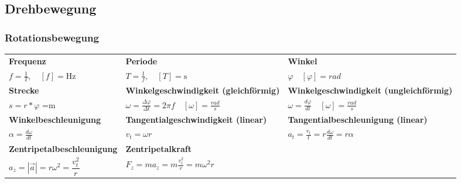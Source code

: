 \documentclass[10pt,a4paper]{article}
\begin{document}
		\subsection{Drehbewegung}
		\subsubsection{Rotationsbewegung}
		
		\begin{tabular}{p{} p{} p{}}
			
			\textbf{Frequenz} &
			\textbf{Periode} &
			\textbf{Winkel}
			\\[4pt]
			
			$f = \frac{1}{T},\quad [f] = \mathrm{Hz}$ &
			$T = \frac{1}{f},\quad [T] = \mathrm{s}$ &
			$\varphi \quad [\varphi]=rad$
			\\[10pt]
			
			\textbf{Strecke} &
            \textbf{Winkelgeschwindigkeit (gleichförmig)}&
			\textbf{Winkelgeschwindigkeit (ungleichförmig)}
			\\[4pt]
			
			$s = r*\varphi$ \quad [s]=m &
			$\omega = \frac{\Delta\varphi}{\Delta t} = 2\pi f \quad [\omega]=\frac{rad}{s}$ &
            $\omega = \frac{d\varphi}{dt} \quad [\omega]=\frac{rad}{s}$
			\\[10pt]
			
			\textbf{Winkelbeschleunigung} &
			\textbf{Tangentialgeschwindigkeit (linear)}&
			\textbf{Tangentialbeschleunigung (linear)}
			\\[4pt]
			
			$\alpha=\frac{d\omega}{dt}$ &
			$v_t = \omega r$ &
			$a_t = \frac{v_t}{t} = r \frac{d\omega}{dt} = r\alpha$
			\\[10pt]
			
            \textbf{Zentripetalbeschleunigung}&
			\textbf{Zentripetalkraft}
			\\[4pt]
			
            $a_z = |\vec a| = r\omega^2 = \dfrac{v_t^2}{r}$ &
			$F_z = m a_z = m\frac{v_t^2}{r} = m\omega^2 r$ &
			\\[10pt]
			

\end{tabular}
\end{document}
